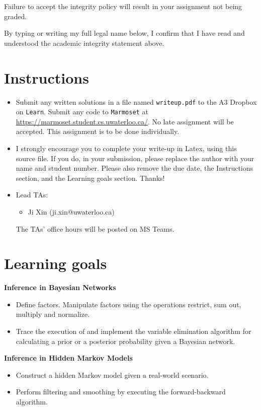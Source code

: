 \documentclass[12pt]{article}
\begin{document}
Failure to accept the integrity policy will result in your assignment not being graded.

By typing or writing my full legal name below, I confirm that I have read and understood the academic integrity statement above.




\newpage
\section*{Instructions}

\begin{itemize}
\item
Submit any written solutions in a file named \verb+writeup.pdf+ to the A3 Dropbox on \verb+Learn+. Submit any code to \verb+Marmoset+ at \url{https://marmoset.student.cs.uwaterloo.ca/}. 
No late assignment will be accepted. This assignment is to be done individually.

\item 
I strongly encourage you to complete your write-up in Latex, using this source file. If you do, in your submission, please replace the author with your name and student number. Please also remove the due date, the Instructions section, and the Learning goals section. Thanks!

\item
Lead TAs: 
\begin{itemize}
\item
Ji Xin (ji.xin@uwaterloo.ca)
\end{itemize}
The TAs' office hours will be posted on MS Teams.
\end{itemize}


\section*{Learning goals}

{\bf Inference in Bayesian Networks}
\begin{itemize}
\item
Define factors. Manipulate factors using the operations restrict, sum out, multiply and normalize.
\item
Trace the execution of and implement the variable elimination algorithm for calculating a prior or a posterior probability given a Bayesian network.
\end{itemize}

{\bf Inference in Hidden Markov Models}
\begin{itemize}
\item
Construct a hidden Markov model given a real-world scenario.
\item 
Perform filtering and smoothing by executing the forward-backward algorithm.
\end{itemize}
\end{document}
